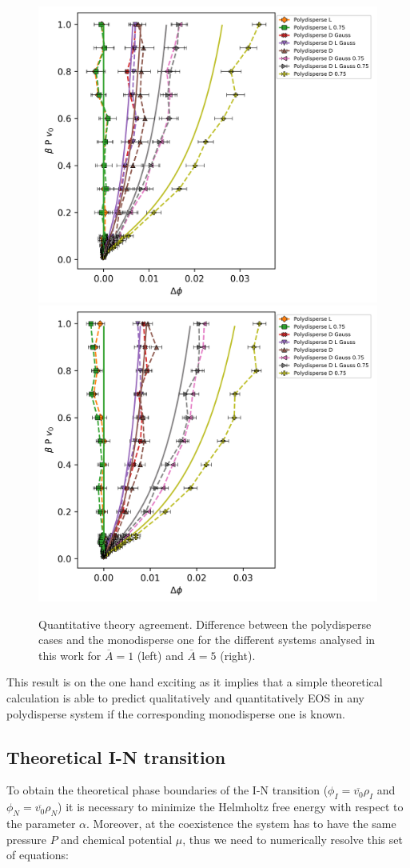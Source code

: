 \documentclass[journal=jacsat,manuscript=article]{achemso}
\begin{document}
\begin{figure}[!h]
	\centering
	\includegraphics[width=0.45 \columnwidth]{Figures/Deltaphi_P_A1.png}
	\includegraphics[width=0.45 \columnwidth]{Figures/Deltaphi_P_A5.png}
	\caption{Quantitative theory agreement. Difference between the polydisperse cases and the monodisperse one for the different systems analysed in this work for $\overline{A} = 1$ (left) and $\overline{A} = 5$ (right).}
	\label{fig:DeltaP_P}
\end{figure}

This result is on the one hand exciting as it implies that a simple theoretical calculation is able to predict qualitatively and quantitatively EOS in any  polydisperse system if the corresponding monodisperse one is known. 




\subsection{Theoretical I-N transition}

To obtain the theoretical phase boundaries of the I-N transition ($\phi_I = \overline{v_0} \rho_I$ and $\phi_N = \overline{v_0} \rho_N$) it is necessary to minimize the Helmholtz free energy with respect to the parameter $\alpha$. Moreover, at the coexistence the system has to have the same pressure $P$ and chemical potential $\mu$, thus we need to numerically resolve this set of equations:
\end{document}
